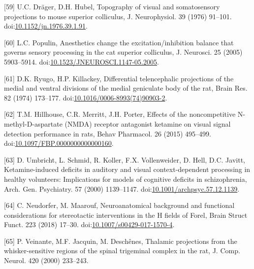 \documentclass[man]{apa6}
\begin{document}
\leavevmode\hypertarget{ref-dragerTopographyVisualSomatosensory1976}{}%
{[}59{]} U.C. Dräger, D.H. Hubel, Topography of visual and somatosensory projections to mouse superior colliculus, J. Neurophysiol. 39 (1976) 91--101. doi:\href{https://doi.org/10.1152/jn.1976.39.1.91}{10.1152/jn.1976.39.1.91}.

\leavevmode\hypertarget{ref-populinAnestheticsChangeExcitation2005}{}%
{[}60{]} L.C. Populin, Anesthetics change the excitation/inhibition balance that governs sensory processing in the cat superior colliculus, J. Neurosci. 25 (2005) 5903--5914. doi:\href{https://doi.org/10.1523/JNEUROSCI.1147-05.2005}{10.1523/JNEUROSCI.1147-05.2005}.

\leavevmode\hypertarget{ref-ryugoDifferentialTelencephalicProjections1974}{}%
{[}61{]} D.K. Ryugo, H.P. Killackey, Differential telencephalic projections of the medial and ventral divisions of the medial geniculate body of the rat, Brain Res. 82 (1974) 173--177. doi:\href{https://doi.org/10.1016/0006-8993(74)90903-2}{10.1016/0006-8993(74)90903-2}.

\leavevmode\hypertarget{ref-hillhouseEffectsNoncompetitiveNmethylDaspartate2015}{}%
{[}62{]} T.M. Hillhouse, C.R. Merritt, J.H. Porter, Effects of the noncompetitive N-methyl-D-aspartate (NMDA) receptor antagonist ketamine on visual signal detection performance in rats, Behav Pharmacol. 26 (2015) 495--499. doi:\href{https://doi.org/10.1097/FBP.0000000000000160}{10.1097/FBP.0000000000000160}.

\leavevmode\hypertarget{ref-umbrichtKetamineinducedDeficitsAuditory2000}{}%
{[}63{]} D. Umbricht, L. Schmid, R. Koller, F.X. Vollenweider, D. Hell, D.C. Javitt, Ketamine-induced deficits in auditory and visual context-dependent processing in healthy volunteers: Implications for models of cognitive deficits in schizophrenia, Arch. Gen. Psychiatry. 57 (2000) 1139--1147. doi:\href{https://doi.org/10.1001/archpsyc.57.12.1139}{10.1001/archpsyc.57.12.1139}.

\leavevmode\hypertarget{ref-neudorferNeuroanatomicalBackgroundFunctional2018}{}%
{[}64{]} C. Neudorfer, M. Maarouf, Neuroanatomical background and functional considerations for stereotactic interventions in the H fields of Forel, Brain Struct Funct. 223 (2018) 17--30. doi:\href{https://doi.org/10.1007/s00429-017-1570-4}{10.1007/s00429-017-1570-4}.

\leavevmode\hypertarget{ref-veinanteThalamicProjectionsWhiskersensitive2000}{}%
{[}65{]} P. Veinante, M.F. Jacquin, M. Deschênes, Thalamic projections from the whisker-sensitive regions of the spinal trigeminal complex in the rat, J. Comp. Neurol. 420 (2000) 233--243.
\end{document}
